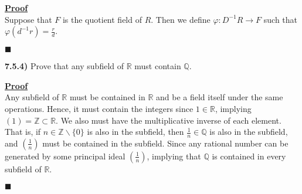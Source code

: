 \documentclass[12pt,a4paper]{article}
\newcommand{\prob}[2]{\textbf{#1)} #2}
\newenvironment{proof}
{
\textbf{\underline{Proof}} \\
}
{
\begin{flushright}
$\blacksquare$
\end{flushright}}
\begin{document}
\begin{proof}
    Suppose that $F$ is the quotient field of $R$.
    Then we define $\varphi: D^{-1}R \to F$ such that $\varphi(d^{-1}r) = \frac{r}{d}$.
     
\end{proof}

\prob{7.5.4}{
Prove that any subfield of $\mathbb{R}$ must contain $\mathbb{Q}$.
}
 
\begin{proof}
    Any subfield of $\mathbb{R}$ must be contained in $\mathbb{R}$ and be a field itself under the same operations.
    Hence, it must contain the integers since $1 \in \mathbb{R}$, implying $(1) = \mathbb{Z} \subset \mathbb{R}$.
    We also must have the multiplicative inverse of each element.
    That is, if $n \in \mathbb{Z} \backslash \{ 0 \} $ is also in the subfield, then $\frac{1}{n} \in \mathbb{Q}$ is also in the subfield, and $\left( \frac{1}{n} \right)$ must be contained in the subfield.
    Since any rational number can be generated by some principal ideal $\left( \frac{1}{n} \right)$, implying that $\mathbb{Q}$ is contained in every subfield of $\mathbb{R}$.
\end{proof}
\end{document}
